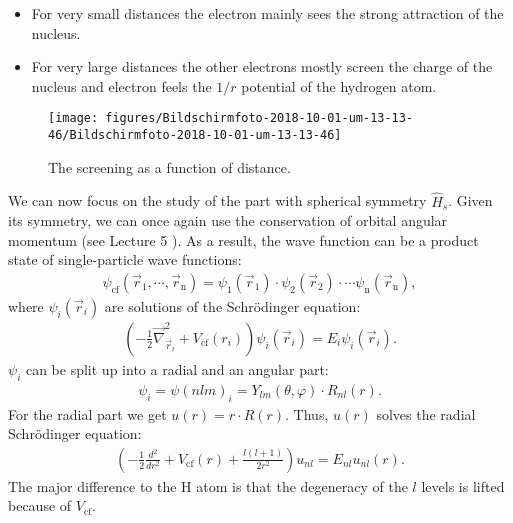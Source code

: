 \documentclass[10pt]{article}
\let\cite\citep
\providecommand\citep{\cite}
\newcommand*\ch[1]{\ensuremath{\mathrm{#1}}}
\begin{document}
\begin{itemize}
\item For very small distances the electron mainly sees the strong attraction of the nucleus.
\item For very large distances the other electrons mostly screen the charge of the nucleus and electron feels the $1/r$ potential of the hydrogen atom.
\end{itemize}
\begin{figure}[h!]
\begin{center}
\texttt{[image: figures/Bildschirmfoto-2018-10-01-um-13-13-46/Bildschirmfoto-2018-10-01-um-13-13-46]}
\caption{{The screening as a function of distance.
{\label{342008}}%
}}
\end{center}
\end{figure}

We can now focus on the study of the part with spherical symmetry $\hat{H}_s$. Given its symmetry, we can once again use the conservation of orbital angular momentum (see Lecture 5 \cite{Jendrzejewskic}). As a result, the wave function can be a product state of single-particle wave functions:
%
\begin{align}
\psi_\textrm{cf} (\vec{r}_1 , \cdots , \vec{r}_\textrm{n} ) = \psi_1 (\vec{r}_1) \cdot \psi_2(\vec{r}_2) \cdot \cdots \psi_\textrm{n}(\vec{r}_\textrm{n}),
\end{align}
%
where $\psi_i(\vec{r}_i)$ are solutions of the Schrödinger equation:
%
\begin{align}
\left( - \frac{1}{2} \vec{\nabla}^2_{\vec{r}_i} + V_\textrm{cf} (r_i) \right) \psi_i (\vec{r}_i) = E_i \psi_i(\vec{r}_i).
\end{align}
%
$\psi_i$ can be split up into a radial and an angular part:
%
\begin{align}
\psi_i = \psi(nlm)_i = Y_{lm} (\theta, \varphi) \cdot R_{nl} (r).
\end{align}
%
For the radial part we get $u(r) = r\cdot R(r)$. Thus, $u(r)$ solves the radial Schrödinger equation:
%
\begin{align}
\left( - \frac{1}{2} \frac{d^2}{dr^2} + V_\textrm{cf}(r) + \frac{l(l+1)}{2r^2}\right) u_{nl} = E_{nl} u_{nl} (r).
\end{align}
%
The major difference to the \ch{H} atom is that the degeneracy of the $l$ levels is lifted because of $V_\textrm{cf}$. 
\end{document}
